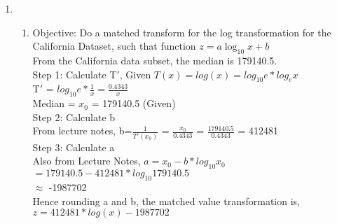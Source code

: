 \documentclass{article}
\begin{document}

\begin{enumerate}
\item 
\begin{enumerate}
\item Objective: Do a matched transform for the log transformation for the California Dataset, such that function $z=a\log_{10}{x}+b$
\\ From the California data subset, the median is 179140.5.
\\ Step 1: Calculate T$'$, Given $T(x)=log(x) = log_{10}e*log_{e}x$
\\ T$'$ = $log_{10}e*\frac{1}{x} = \frac{0.4343}{x}$
\\ Median = $x_0$ = 179140.5 (Given)
\\ Step 2: Calculate b
\\ From lecture notes, b=$\frac{1}{T'(x_0)}$ = $\frac{x_0}{0.4343}$ = $\frac{179140.5}{0.4343}$ = 412481
\\ Step 3: Calculate a
\\ Also from Lecture Notes, $a = x_0 - b*log_{10}x_0$ 
\\ $=179140.5-412481*log_{10}179140.5$
\\ $\approx$ -1987702
\\ Hence rounding a and b, the matched value transformation is, $z=412481*log(x)-1987702$
\end{enumerate}
\end{enumerate}
\end{document}
